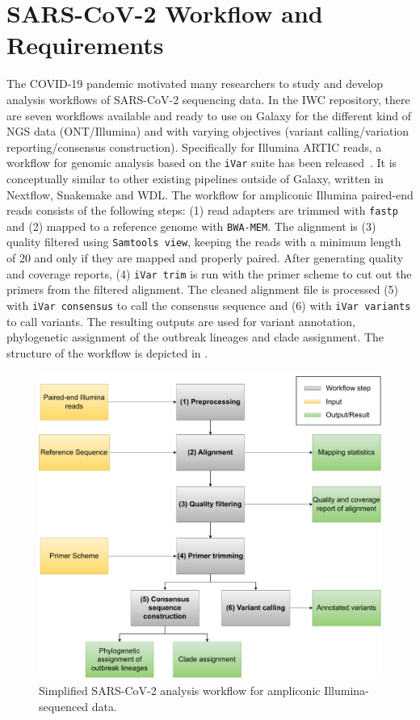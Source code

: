 \section{SARS-CoV-2 Workflow and Requirements}
The \ac{COVID-19} pandemic motivated many researchers to study and develop analysis workflows of \ac{SARS-CoV-2} sequencing data. In the \ac{IWC} repository, there are seven workflows available and ready to use on Galaxy for the different kind of NGS data (ONT/Illumina) and with varying objectives (variant calling/variation reporting/consensus construction). Specifically for Illumina ARTIC reads, a workflow for genomic analysis based on the \texttt{iVar} suite has been released~\cite{iwc2021covidivar}. It is conceptually similar to other existing pipelines outside of Galaxy, written in Nextflow, Snakemake and \ac{WDL}. The workflow for ampliconic Illumina paired-end reads consists of the following steps: (1) read adapters are trimmed with \texttt{fastp} and (2) mapped to a reference genome with \texttt{BWA-MEM}. The alignment is (3) quality filtered using \texttt{Samtools view}, keeping the reads with a minimum length of 20 and only if they are mapped and properly paired. After generating quality and coverage reports, (4) \texttt{iVar trim} is run with the primer scheme to cut out the primers from the filtered alignment. The cleaned alignment file is processed (5) with \texttt{iVar consensus} to call the consensus sequence and (6) with \texttt{iVar variants} to call variants. The resulting outputs are used for variant annotation, phylogenetic assignment of the outbreak lineages and clade assignment. The structure of the workflow is depicted in . 

\begin{figure}[h!]
	\includegraphics[width=1\textwidth]{media/3-sars-cov-2.pdf}
	\caption{Simplified SARS-CoV-2 analysis workflow for ampliconic Illumina-sequenced data.}
	\label{fig:3-sars-wf}
\end{figure}

